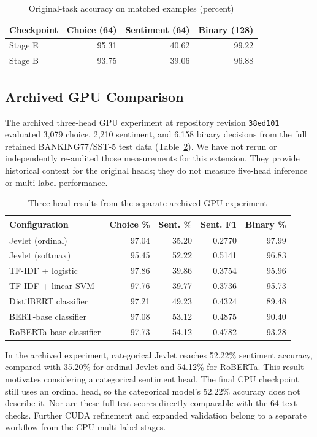 \documentclass[conference]{IEEEtran}
\begin{document}
\begin{table}[!t]
\caption{Original-task accuracy on matched examples (percent)}
\label{tab:legacyretention}
\centering\footnotesize\setlength{\tabcolsep}{4pt}
\begin{tabular}{lrrr}\toprule
Checkpoint & Choice (64) & Sentiment (64) & Binary (128)\\\midrule
Stage E & 95.31 & 40.62 & 99.22\\
Stage B & 93.75 & 39.06 & 96.88\\
\bottomrule\end{tabular}
\end{table}

\subsection{Archived GPU Comparison}
The archived three-head GPU experiment at repository revision \texttt{38ed101} evaluated 3,079 choice, 2,210 sentiment, and 6,158 binary decisions from the full retained BANKING77/SST-5 test data (Table~\ref{tab:historical}). We have not rerun or independently re-audited those measurements for this extension. They provide historical context for the original heads; they do not measure five-head inference or multi-label performance.

\begin{table}[!t]
\caption{Three-head results from the separate archived GPU experiment}
\label{tab:historical}
\centering\scriptsize\setlength{\tabcolsep}{2.5pt}
\begin{tabular}{lrrrr}\toprule
Configuration & Choice \% & Sent. \% & Sent. F1 & Binary \%\\\midrule
Jevlet (ordinal) & 97.04 & 35.20 & 0.2770 & 97.99\\
Jevlet (softmax) & 95.45 & 52.22 & 0.5141 & 96.83\\
TF-IDF + logistic & 97.86 & 39.86 & 0.3754 & 95.96\\
TF-IDF + linear SVM & 97.76 & 39.77 & 0.3736 & 95.73\\
DistilBERT classifier & 97.21 & 49.23 & 0.4324 & 89.48\\
BERT-base classifier & 97.08 & 53.12 & 0.4875 & 90.40\\
RoBERTa-base classifier & 97.73 & 54.12 & 0.4782 & 93.28\\
\bottomrule\end{tabular}
\end{table}

In the archived experiment, categorical Jevlet reaches 52.22\% sentiment accuracy, compared with 35.20\% for ordinal Jevlet and 54.12\% for RoBERTa. This result motivates considering a categorical sentiment head. The final CPU checkpoint still uses an ordinal head, so the categorical model's 52.22\% accuracy does not describe it. Nor are these full-test scores directly comparable with the 64-text checks. Further CUDA refinement and expanded validation belong to a separate workflow from the CPU multi-label stages.
\end{document}

